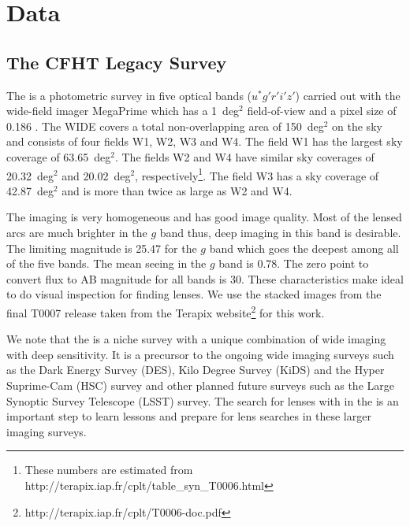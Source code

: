 \documentclass[useAMS,usenatbib,a4paper]{mn2e}
\begin{document}

\section{Data}
\label{sec:data}
\subsection{The CFHT Legacy Survey}
\label{sec:data:cfhtls}

The \cfhtls is a photometric survey in five optical bands
($u^*g'r'i'z'$) carried out with the wide-field imager MegaPrime which
has a 1~deg$^2$ field-of-view and a pixel size of 0.186\arcsec
\citep{Gwyn2012}. The \cfhtls \textsc{WIDE} covers a total
non-overlapping area of 150~deg$^2$ on the sky and consists of four
fields W1, W2, W3 and W4. The field W1 has the largest sky coverage of
63.65~deg$^2$. The fields W2 and W4 have similar sky coverages of
20.32~deg$^2$ and 20.02~deg$^2$, respectively\footnote{These numbers are
estimated from http://terapix.iap.fr/cplt/table\_syn\_T0006.html}.  The
field W3 has a sky coverage of 42.87~deg$^2$ and is more than twice as
large as W2 and W4.

The \cfhtls imaging is very homogeneous and has good image quality. Most
of the lensed arcs are much brighter in the $g$ band thus, deep imaging
in this band is desirable. The limiting magnitude is 25.47 for the $g$
band which goes the deepest among all of the five bands. The mean seeing
in the $g$ band is 0.78\arcsec. The zero point to convert flux to AB
magnitude for all bands is 30. These characteristics make \cfhtls ideal
to do visual inspection for finding lenses.  We use the stacked images
from the final T0007 release taken from the Terapix
website\footnote{{http://terapix.iap.fr/cplt/T0006-doc.pdf}} for this
work.

We note that the \cfhtls is a niche survey with a unique combination of wide
imaging with deep sensitivity. It is a precursor to the ongoing wide imaging
surveys such as the Dark Energy Survey (DES), Kilo Degree Survey (KiDS) and the
Hyper Suprime-Cam (HSC) survey and other planned future surveys such as the
Large Synoptic Survey Telescope (LSST) survey.  The search for lenses with \sw
in the \cfhtls is an important step to learn lessons and prepare for lens
searches in these larger imaging surveys.


\end{document}
